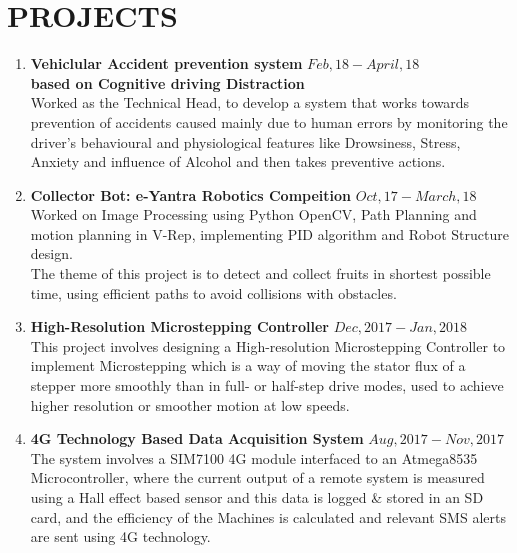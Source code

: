 \documentclass[margin]{res}
\begin{document}
\begin{resume}
\begin{flushleft}
\begin{tabular}{ |m{3em}|m{10em}|m{6em}|m{4em}|m{8em}| }
\end{tabular}
\end{flushleft}

\section{PROJECTS} 


\begin{enumerate}
   \item \textbf{Vehiclular Accident prevention system} \hfill \(Feb,18 - April,18\)\\
   \textbf{based on Cognitive driving Distraction}\\
   Worked as the Technical Head, to develop a system that works towards prevention of accidents caused mainly due to human errors by monitoring the driver's behavioural and physiological features like Drowsiness, Stress, Anxiety and influence of Alcohol and then takes preventive actions.\\

\item \textbf{Collector Bot: e-Yantra Robotics Compeition} \hfill \(Oct,17 - March,18\)\\
   Worked on Image Processing using Python OpenCV, Path Planning and motion planning in V-Rep, implementing PID algorithm and Robot Structure design. \\The theme of this project is to detect and collect fruits in shortest possible time, using efficient paths to avoid collisions with obstacles. \\

   \item \textbf{High-Resolution Microstepping Controller }                           \hfill \(Dec,2017-Jan,2018\)\\
This project involves designing a High-resolution Microstepping Controller to implement Microstepping which is a way of moving the stator flux of a stepper more smoothly than in full- or half-step drive modes, used to achieve higher resolution or smoother motion at low speeds.  \\

   \item \textbf{4G Technology Based Data Acquisition System}                     \hfill             \(Aug,2017-Nov,2017\)\\
The system involves a SIM7100 4G module interfaced to an Atmega8535 Microcontroller, where the current output of a remote system is measured using a Hall effect based sensor and this data is logged \& stored in an SD card, and the efficiency of the Machines is calculated and relevant SMS alerts are sent using 4G technology. 



\end{enumerate}
\end{resume}
\end{document}
